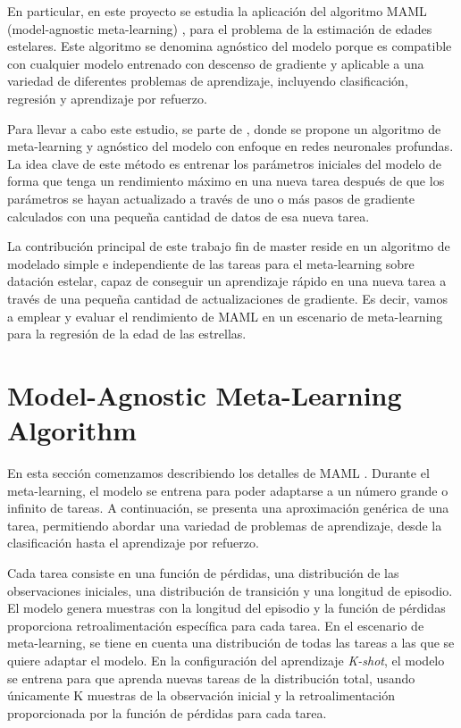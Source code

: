 En particular, en este proyecto se estudia la aplicación del algoritmo MAML (model-agnostic meta-learning) \cite{finn2017modelagnostic}, para el problema de la estimación de edades estelares. Este algoritmo se denomina agnóstico del modelo porque es compatible con cualquier modelo entrenado con descenso de gradiente y aplicable a una variedad de diferentes problemas de aprendizaje, incluyendo clasificación, regresión y aprendizaje por refuerzo. 

Para llevar a cabo este estudio, se parte de \cite{finn2017modelagnostic}, donde se propone un algoritmo de meta-learning y agnóstico del modelo con enfoque en redes neuronales profundas. La idea clave de este método es entrenar los parámetros iniciales del modelo de forma que tenga un rendimiento máximo en una nueva tarea después de que los parámetros se hayan actualizado a través de uno o más pasos de gradiente calculados con una pequeña cantidad de datos de esa nueva tarea.

La contribución principal de este trabajo fin de master reside en un algoritmo de modelado simple e independiente de las tareas para el meta-learning sobre datación estelar, capaz de conseguir un aprendizaje rápido en una nueva tarea a través de una pequeña cantidad de actualizaciones de gradiente. Es decir, vamos a emplear y evaluar el rendimiento de MAML en un escenario de meta-learning para la regresión de la edad de las estrellas. 

\section{Model-Agnostic Meta-Learning Algorithm}
En esta sección comenzamos describiendo los detalles de MAML \cite{finn2017modelagnostic}. Durante el meta-learning, el modelo se entrena para poder adaptarse a un número grande o infinito de tareas. A continuación, se presenta una aproximación genérica de una tarea, permitiendo abordar una variedad de problemas de aprendizaje, desde la clasificación hasta el aprendizaje por refuerzo.

Cada tarea consiste en una función de pérdidas, una distribución de las observaciones iniciales, una distribución de transición y una longitud de episodio. El modelo genera muestras con la longitud del episodio y la función de pérdidas proporciona retroalimentación específica para cada tarea.
En el escenario de meta-learning, se tiene en cuenta una distribución de todas las tareas a las que se quiere adaptar el modelo. En la configuración del aprendizaje \emph{K-shot}, el modelo se entrena para que aprenda nuevas tareas de la distribución total, usando únicamente K muestras de la observación inicial y la retroalimentación proporcionada por la función de pérdidas para cada tarea. 

